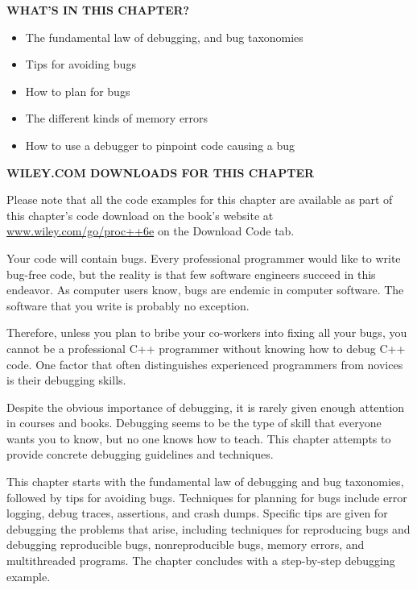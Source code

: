 \noindent
\textbf{WHAT’S IN THIS CHAPTER?}

\begin{itemize}
\item
The fundamental law of debugging, and bug taxonomies

\item
Tips for avoiding bugs

\item
How to plan for bugs

\item
The different kinds of memory errors

\item
How to use a debugger to pinpoint code causing a bug
\end{itemize}

\noindent
\textbf{WILEY.COM DOWNLOADS FOR THIS CHAPTER}

Please note that all the code examples for this chapter are available as part of this chapter’s code download on the book’s website at \url{www.wiley.com/go/proc++6e} on the Download Code tab.

Your code will contain bugs. Every professional programmer would like to write bug-free code, but the reality is that few software engineers succeed in this endeavor. As computer users know, bugs are endemic in computer software. The software that you write is probably no exception.

Therefore, unless you plan to bribe your co-workers into fixing all your bugs, you cannot be a professional C++ programmer without knowing how to debug C++ code. One factor that often distinguishes experienced programmers from novices is their debugging skills.

Despite the obvious importance of debugging, it is rarely given enough attention in courses and books. Debugging seems to be the type of skill that everyone wants you to know, but no one knows how to teach. This chapter attempts to provide concrete debugging guidelines and techniques.

This chapter starts with the fundamental law of debugging and bug taxonomies, followed by tips for avoiding bugs. Techniques for planning for bugs include error logging, debug traces, assertions, and crash dumps. Specific tips are given for debugging the problems that arise, including techniques for reproducing bugs and debugging reproducible bugs, nonreproducible bugs, memory errors, and multithreaded programs. The chapter concludes with a step-by-step debugging example.
